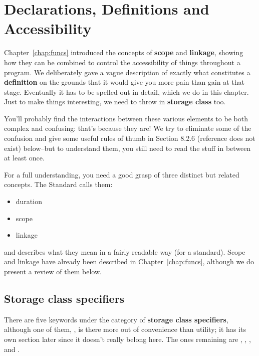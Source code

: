  
        \section{Declarations, Definitions and Accessibility}
        

  

  Chapter~\ref{chap:funcs} introduced the concepts of \textbf{scope} and
   \textbf{linkage}, showing how they can be combined to control the
   accessibility of things throughout a program. We deliberately gave
   a vague description of exactly what constitutes a \textbf{definition}
   on the grounds that it would give you more pain than gain at that stage.
   Eventually it has to be spelled out in detail, which we do in this
   chapter. Just to make things interesting, we need to throw in
   \textbf{storage class} too.


  You'll probably find the interactions between these various elements to
   be both complex and confusing: that's because they are! We try to
   eliminate some of the confusion and give some useful rules of thumb in
   Section 8.2.6 (reference does not exist) below--but to understand them, you still
   need to read the stuff in between at least once.


  For a full understanding, you need a good grasp of three distinct but
   related concepts. The Standard calls them:


  \begin{itemize}
   \item duration
   \item scope
   \item linkage
  \end{itemize}

  and describes what they mean in a fairly readable way (for a standard).
   Scope and linkage have already been described in Chapter~\ref{chap:funcs},
   although we do present a review of them below.


  \subsection{Storage class specifiers}
   

   There are five keywords under the category of \textbf{storage class
    specifiers}, although one of them, \typedef, is there
    more out of convenience than utility; it has its own section later since
    it doesn't really belong here. The ones remaining are \auto,
    \extern, \register, and \static.


